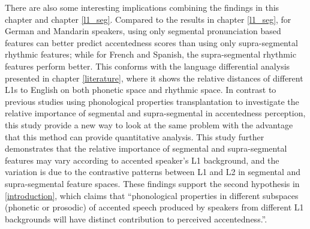 There are also some interesting implications combining the findings in this chapter and chapter \ref{l1_seg}. Compared to the results in chapter \ref{l1_seg}, for German and Mandarin speakers, using only segmental pronunciation based features can better predict accentedness scores than using only supra-segmental rhythmic features; while for French and Spanish, the supra-segmental rhythmic features perform better. This conforms with the language differential analysis presented in chapter \ref{literature}, where it shows the relative distances of different L1s to English on both phonetic space and rhythmic space. 
In contrast to previous studies using phonological properties transplantation to investigate the relative importance of segmental and supra-segmental in accentedness perception, this study provide a new way to look at the same problem with the advantage that this method can provide quantitative analysis. This study further demonstrates that the relative importance of segmental and supra-segmental features may vary according to accented speaker's L1 background, and the variation is due to the contrastive patterns between L1 and L2 in segmental and supra-segmental feature spaces. These findings support the second hypothesis in \ref{introduction}, which claims that ``phonological properties in different subspaces (phonetic or prosodic) of accented speech produced by speakers from different L1 backgrounds will have distinct contribution to perceived accentedness.''.

